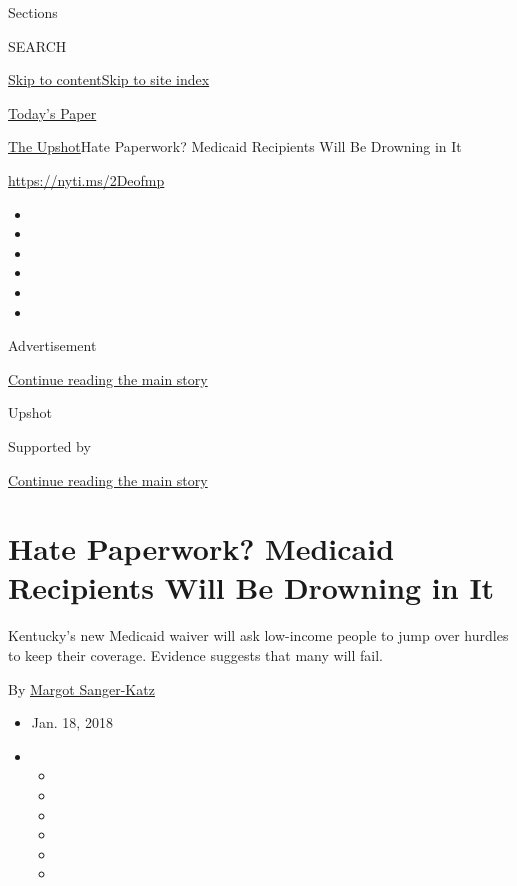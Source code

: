 Sections

SEARCH

\protect\hyperlink{site-content}{Skip to
content}\protect\hyperlink{site-index}{Skip to site index}

\href{https://myaccount.nytimes3xbfgragh.onion/auth/login?response_type=cookie\&client_id=vi}{}

\href{https://www.nytimes3xbfgragh.onion/section/todayspaper}{Today's
Paper}

\href{/section/upshot}{The Upshot}\textbar{}Hate Paperwork? Medicaid
Recipients Will Be Drowning in It

\url{https://nyti.ms/2Deofmp}

\begin{itemize}
\item
\item
\item
\item
\item
\item
\end{itemize}

Advertisement

\protect\hyperlink{after-top}{Continue reading the main story}

Upshot

Supported by

\protect\hyperlink{after-sponsor}{Continue reading the main story}

\hypertarget{hate-paperwork-medicaid-recipients-will-be-drowning-in-it}{%
\section{Hate Paperwork? Medicaid Recipients Will Be Drowning in
It}\label{hate-paperwork-medicaid-recipients-will-be-drowning-in-it}}

Kentucky's new Medicaid waiver will ask low-income people to jump over
hurdles to keep their coverage. Evidence suggests that many will fail.

By \href{http://www.nytimes3xbfgragh.onion/by/margot-sanger-katz}{Margot
Sanger-Katz}

\begin{itemize}
\item
  Jan. 18, 2018
\item
  \begin{itemize}
  \item
  \item
  \item
  \item
  \item
  \item
  \end{itemize}
\end{itemize}

